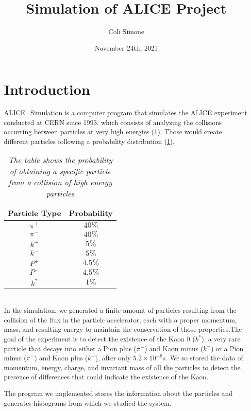 \documentclass[a4paper, 11pt]{article}
\begin{document}
  \title{Simulation of ALICE Project}
  \author{Coli Simone}
  \date{November 24th, 2021}
  \maketitle
  \section{Introduction}

  ALICE\_Simulation is a computer program that simulates the ALICE experiment conducted at CERN since 1993, which consists of analyzing the collisions occurring between particles at very high energies (1). Those would create different particles following a probability distribution (\ref{table1}).
    \begin{table}[h!]
      \centering
      \begin{tabular}{ c c }
        \hline
        Particle Type & Probability \\
        \hline
        $\pi^+$ & $40\%$ \\
        $\pi^-$ & $40\%$ \\
        $k^+$ & $5\%$\\
        $k^-$ & $5\%$\\
        $P^+$ & $4.5\%$\\
        $P^-$ & $4.5\%$\\
        $k^*$ & $1\%$\\
        \hline
      \end{tabular}
      \caption{ \label{table1}
      \textit{The table shows the probability of obtaining a specific particle from a collision of high energy particles}
      }
    \end{table}\\

    In the simulation, we generated a finite amount of particles resulting from the collision of the flux in the particle accelerator, each with a proper momentum, mass, and resulting energy to maintain the conservation of those properties.The goal of the experiment is to detect the existence of the Kaon 0 ($k^*$), a very rare particle that decays into either a Pion plus ($\pi^+$) and Kaon minus ($k^-$) or a Pion minus ($\pi^-$) and Kaon plus ($k^+$), after only $5.2 \times 10^{-8}s$. We so stored the data of momentum, energy, charge, and invariant mass of all the particles to detect the presence of differences that could indicate the existence of the Kaon.

    The program we implemented stores the information about the particles and generates histograms from which we studied the system.
\end{document}
